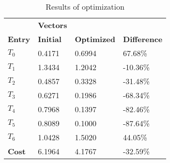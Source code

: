 \begin{table}[h!]
\centering
\begin{tabular}{llll}
\textbf{}      & \cellcolor[HTML]{EFEFEF}\textbf{Vectors} & \textbf{} & \textbf{}         \\
\rowcolor[HTML]{EFEFEF} 
\textbf{Entry} & \textbf{Initial} & \textbf{Optimized} & \textbf{Difference} \\
$T_0$ & 0.4171 & 0.6994 & 67.68\% \\ 
$T_1$ & 1.3434 & 1.2042 & -10.36\% \\ 
$T_2$ & 0.4857 & 0.3328 & -31.48\% \\ 
$T_3$ & 0.6271 & 0.1986 & -68.34\% \\ 
$T_4$ & 0.7968 & 0.1397 & -82.46\% \\ 
$T_5$ & 0.8089 & 0.1000 & -87.64\% \\ 
$T_6$ & 1.0428 & 1.5020 & 44.05\% \\ 
\rowcolor[HTML]{EFEFEF} 
\textbf{Cost}  & 6.1964 & 4.1767 & -32.59\% \\ 
\end{tabular}
\caption{Results of optimization}
\label{tab:OptimizationAnalysis}
\end{table}